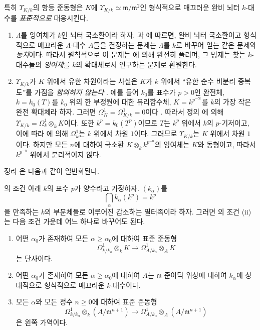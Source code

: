 
특히 $\Upsilon_{K/k}$의 항등 준동형은 $K$에
$\Upsilon_{K/k}\simeq\mathfrak m/\mathfrak m^2$인 형식적으로 매끄러운
완비 뇌터 $k$-대수를 \emph{표준적으로} 대응시킨다.

\begin{remarks}[22.2.7]
\label{0.22.2.7-ko}
\begin{enumerate}
  \item[\rm(i)] $\Lambda$를 잉여체가 $k$인 뇌터 국소환이라 하자.
  과 에 따르면, 완비 뇌터
  국소환이고 형식적으로 매끄러운 $\Lambda$-대수 $A$들을 결정하는 문제는
  $\Lambda$를 $k$로 바꾸어 얻는 같은 문제와 \emph{동치}이다. 따라서
  원칙적으로 이 문제는 에 의해 완전히 풀리며, 그
  명제는 찾는 $k$-대수들의 \emph{잉여체}를 $k$의 확대체로서 연구하는
  문제로 환원한다.

  \item[\rm(ii)] $\Upsilon_{K/k}$가 $K$ 위에서 유한 차원이라는 사실은
  $K$가 $k$ 위에서 ``유한 순수 비분리 중복도''를 가짐을
  \emph{함의하지 않는다} . 예를 들어 $k_0$를
  표수가 $p>0$인 완전체, $k=k_0(T)$를 $k_0$ 위의 한 부정원에 대한
  유리함수체, $K=k^{p^{-\infty}}$를 $k$의 가장 작은 완전 확대체라 하자.
  그러면
  $\Omega^1_K=\Omega^1_{K/k}=0$이다 . 따라서 정의
  에 의해
  $\Upsilon_{K/k}=\Omega^1_k\otimes_kK$이다. 또한
  $k^p=k_0(T^p)$이므로 $T$는 $k^p$ 위에서 $k$의 $p$-기저이고, 이에 따라
  에 의해 $\Omega^1_k$는 $k$ 위에서 차원 $1$이다.
  그러므로 $\Upsilon_{K/k}$는 $K$ 위에서 차원 $1$이다. 하지만 모든
  $n$에 대하여 국소환 $K\otimes_kk^{p^{-n}}$의 잉여체는 $K$와
  동형이고, 따라서 $k^{p^{-n}}$ 위에서 분리적이지 않다.
\end{enumerate}
\end{remarks}

정리 은 다음과 같이 일반화된다.

\begin{proposition}[22.2.8]
\label{0.22.2.8-ko}
의 조건 아래 $k$의 표수 $p$가 양수라고 가정하자.
$(k_\alpha)$를
\[
  \bigcap_\alpha k_\alpha(k^p)=k^p
\]
을 만족하는 $k$의 부분체들로 이루어진 감소하는 필터족이라 하자.
그러면 의 조건 (ii)는 다음 조건 가운데 어느 하나로
바꾸어도 된다.
\begin{enumerate}
  \item[a)] 어떤 $\alpha_0$가 존재하여 모든
  $\alpha\geqslant\alpha_0$에 대하여 표준 준동형
  \[
    \Omega^1_{k/k_\alpha}\otimes_kK
    \longrightarrow\Omega^1_{A/k_\alpha}\otimes_AK
  \]
  는 단사이다.
  \item[b)] 어떤 $\alpha_0$가 존재하여 모든
  $\alpha\geqslant\alpha_0$에 대하여 $A$는 $\mathfrak m$-준아딕
  위상에 대하여 $k_\alpha$에 상대적으로 형식적으로 매끄러운
  $k$-대수이다.
  \item[c)] 모든 $\alpha$와 모든 정수 $n\geqslant0$에 대하여 표준
  준동형
  \[
    \Omega^1_{k/k_\alpha}\otimes_k(A/\mathfrak m^{n+1})
    \longrightarrow
    \Omega^1_{A/k_\alpha}\otimes_A(A/\mathfrak m^{n+1})
  \]
  은 왼쪽 가역이다.
\end{enumerate}
\end{proposition}

